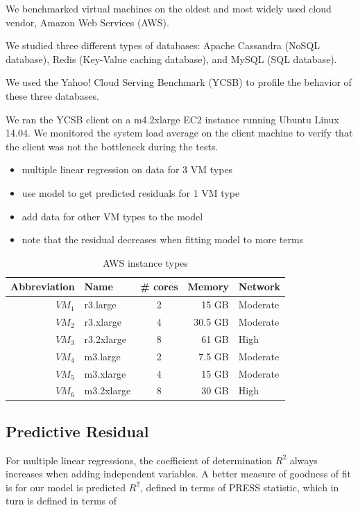 \documentclass{acm_proc_article-sp}
\begin{document}
We benchmarked virtual machines on the oldest and most widely used cloud vendor, Amazon Web Services (AWS).

We studied three different types of databases: Apache Cassandra (NoSQL database), Redis (Key-Value caching database), and MySQL (SQL database).

We used the Yahoo! Cloud Serving Benchmark (YCSB) to profile the behavior of these three databases.

We ran the YCSB client on a m4.2xlarge EC2 instance running Ubuntu Linux 14.04. We monitored the system load average on the client machine to verify that the client was not the bottleneck during the tests.

\begin{itemize}
\item multiple linear regression on data for 3 VM types
\item use model to get predicted residuals for 1 VM type
\item add data for other VM types to the model
\item note that the residual decreases when fitting model to more terms
\end{itemize}

\begin{table}
\centering
\caption{AWS instance types}
\begin{tabular}{|r|l|c|r|l|} \hline
Abbreviation&Name& \# cores&Memory&Network\\ \hline
$VM_1$ & r3.large & 2 & 15 GB & Moderate\\ \hline
$VM_2$ & r3.xlarge & 4 & 30.5 GB & Moderate\\ \hline
$VM_3$ & r3.2xlarge & 8 & 61 GB & High\\ \hline
$VM_4$ & m3.large & 2 & 7.5 GB & Moderate\\ \hline
$VM_5$ & m3.xlarge & 4 & 15 GB & Moderate\\ \hline
$VM_6$ & m3.2xlarge & 8 & 30 GB & High\\ \hline
\hline\end{tabular}
\label{table:rdstypes}
\end{table}

\subsection{Predictive Residual}

For multiple linear regressions, the coefficient of determination $R^2$ always increases when adding independent variables.  A better measure of goodness of fit is for our model is predicted $R^2$, defined in terms of PRESS statistic, which in turn is defined in terms of 
\end{document}

